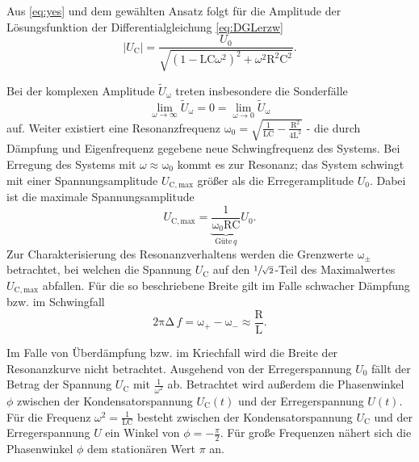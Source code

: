 Aus \eqref{eq:yes} und dem gewählten Ansatz folgt für die Amplitude der Lösungsfunktion der Differentialgleichung \eqref{eq:DGLerzw}
\begin{equation}
	|U_\mathup{C}| = \frac{U_0}{\sqrt{(1 − \mathup{LC}\omega^2)^2 +ω^2\mathup{R^2C^2}}}. 
\end{equation}

Bei der komplexen Amplitude $\tilde{U}_\mathup{\omega}$ treten insbesondere die Sonderfälle
\begin{equation}
 	\lim_{\omega\to\infty} \tilde{U}_\mathup{\omega} =0 =\lim_{\omega\to 0} \tilde{U}_\mathup{\omega} 
\end{equation} auf.
Weiter existiert eine Resonanzfrequenz $\mathup{\omega_0} = \sqrt{\frac{1}{\mathup{LC}}-\frac{\mathup{R^2}}{4\mathup{L^2}}}$ - die durch Dämpfung und Eigenfrequenz gegebene neue Schwingfrequenz des Systems.
Bei Erregung des Systems mit $\omega \approx \mathup{\omega_0}$ kommt es zur Resonanz; das System schwingt mit einer Spannungsamplitude $U_\mathup{C,max}$ größer als die Erregeramplitude $U_0$.
Dabei ist die maximale Spannungsamplitude
\begin{equation}
	U_\mathup{C,max}= \underbrace{\frac{1}{\mathup{\omega_0RC}}}_{\text{Güte}\, q} U_0. 
	\label{eq:maxspannung}
\end{equation}
Zur Charakterisierung des Resonanzverhaltens werden die Grenzwerte $\mathup{\omega_\pm}$ betrachtet, bei welchen die Spannung $U_\mathup{C}$ auf den $\sfrac{1}{\sqrt{2}}$-Teil des Maximalwertes $U_\mathup{C,max}$ abfallen.  
Für die so beschriebene Breite gilt im Falle schwacher Dämpfung bzw. im Schwingfall
\begin{equation}
	\mathup{2\pi\Delta}\, f = \mathup{ω_+} − \mathup{ω_−} \approx \frac{\mathup{R}}{\mathup{L}}.
	\label{eq:deltaf}
\end{equation}

Im Falle von Überdämpfung bzw. im Kriechfall wird die Breite der Resonanzkurve nicht betrachtet. Ausgehend von der  Erregerspannung $U_0$ fällt der Betrag der Spannung $U_\mathup{C}$  mit $\frac{1}{\omega^2}$ ab.
Betrachtet wird außerdem die Phasenwinkel $\phi$ zwischen der Kondensatorspannung $U_\mathup{C}(t)$ und der Erregerspannung $U(t)$.\\
Für die Frequenz $\omega^2 = \frac{1}{\mathup{LC}}$ besteht zwischen der Kondensatorspannung $U_\mathup{C}$ und der Erregerspannung $U$ ein Winkel von $\phi =-\frac{\pi}{2}$.
Für große Frequenzen nähert sich die Phasenwinkel $\phi$ dem stationären Wert $\pi$ an.


